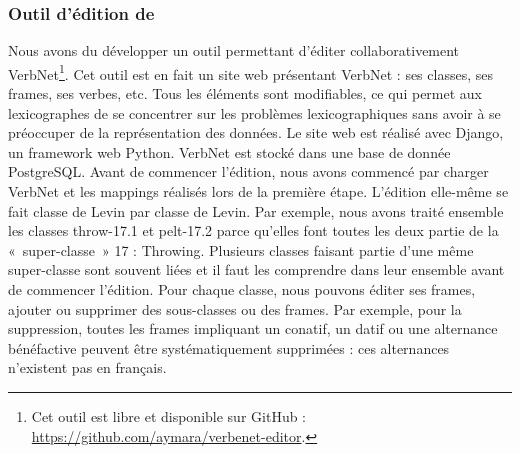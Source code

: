 \subsubsection{Outil d'édition de \verbenet{}}\label{toolquentin}

Nous avons du développer un outil permettant d'éditer collaborativement
VerbNet\footnote{Cet outil est libre et disponible sur GitHub :
\url{https://github.com/aymara/verbenet-editor}.}. Cet outil est en fait un
site web présentant VerbNet : ses classes, ses frames, ses verbes, etc.  Tous
les éléments sont modifiables, ce qui permet aux lexicographes de se concentrer
sur les problèmes lexicographiques sans avoir à se préoccuper de la
représentation des données. Le site web est réalisé avec Django, un framework
web Python. VerbNet est stocké dans une base de donnée PostgreSQL. Avant de
commencer l'édition, nous avons commencé par charger VerbNet et les mappings
réalisés lors de la première étape. L'édition elle-même se fait classe de Levin
par classe de Levin. Par exemple, nous avons traité ensemble les classes
{\color{blue}throw-17.1} et {\color{blue}pelt-17.2} parce qu'elles font toutes
les deux partie de la «~super-classe~» 17 : Throwing. Plusieurs classes faisant
partie d'une même super-classe sont souvent liées et il faut les comprendre
dans leur ensemble avant de commencer l'édition. Pour chaque classe, nous
pouvons éditer ses frames, ajouter ou supprimer des sous-classes ou des frames.
Par exemple, pour la suppression, toutes les frames impliquant un conatif, un
datif ou une alternance bénéfactive peuvent être systématiquement supprimées :
ces alternances n'existent pas en français.

